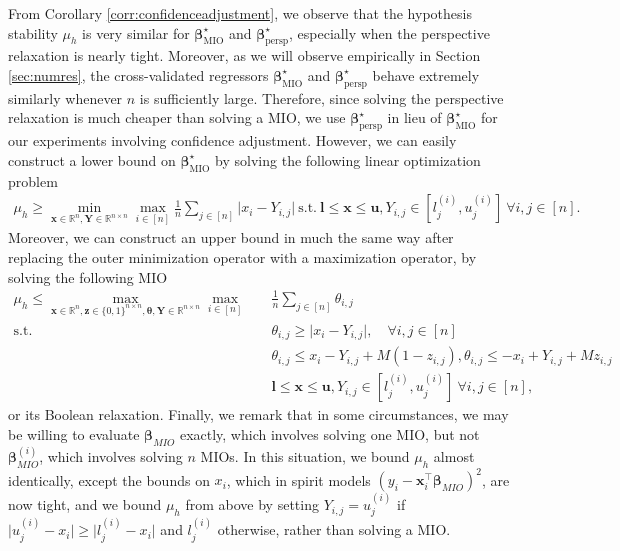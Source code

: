 \documentclass[opre,nonblindrev]{informs3} %
\begin{document}
From Corollary \ref{corr:confidenceadjustment}, we observe that the hypothesis stability $\mu_h$ is very similar for $\bm{\beta}^\star_{\text{MIO}}$ and $\bm{\beta}^\star_{\text{persp}}$, especially when the perspective relaxation is nearly tight. Moreover, as we will observe empirically in Section \ref{sec:numres}, the cross-validated regressors $\bm{\beta}^\star_{\text{MIO}}$ and $\bm{\beta}^\star_{\text{persp}}$ behave extremely similarly whenever $n$ is sufficiently large. Therefore, since solving the perspective relaxation is much cheaper than solving a MIO, we use $\bm{\beta}^\star_{\text{persp}}$ in lieu of $\bm{\beta}^\star_{\text{MIO}}$ for our experiments involving confidence adjustment. However, we can easily construct a lower bound on $\bm{\beta}^\star_{\text{MIO}}$ by solving the following linear optimization problem
\begin{align*}
    \mu_h \geq \min_{\bm{x} \in \mathbb{R}^n, \bm{Y} \in \mathbb{R}^{n \times n}}\max_{i \in [n]} \frac{1}{n} \sum_{j \in [n]}\vert x_i-Y_{i,j}\vert \ \text{s.t.} \ \bm{l} \leq \bm{x} \leq \bm{u}, Y_{i,j} \in [l_j^{(i)}, u_j^{(i)}] \ \forall i,j \in [n].
\end{align*}
Moreover, we can construct an upper bound in much the same way after replacing the outer minimization operator with a maximization operator, by solving the following MIO
\begin{align*}
    \mu_h \leq \max_{\bm{x} \in \mathbb{R}^n, \bm{z} \in \{0, 1\}^{n\times n}, \bm{\theta}, \bm{Y} \in \mathbb{R}^{n \times n}}\max_{i \in [n]} \quad & \frac{1}{n} \sum_{j \in [n]}\theta_{i,j} \\
    \text{s.t.} \quad & \theta_{i,j} \geq \vert x_i-Y_{i,j}\vert, \quad \forall i,j \in [n]\\
    & \theta_{i,j} \leq x_i-Y_{i,j}+M (1-z_{i,j}), \theta_{i,j} \leq -x_i+Y_{i,j}+M z_{i,j}\\
    & \bm{l} \leq \bm{x} \leq \bm{u}, Y_{i,j} \in [l_j^{(i)}, u_j^{(i)}] \ \forall i,j \in [n],
\end{align*}
or its Boolean relaxation. Finally, we remark that in some circumstances, we may be willing to evaluate $\bm{\beta}_{MIO}$ exactly, which involves solving one MIO, but not $\bm{\beta}^{(i)}_{MIO}$, which involves solving $n$ MIOs. In this situation, we bound $\mu_h$ almost identically, except the bounds on $x_i$, which in spirit models $(y_i-\bm{x}_i^\top \bm{\beta}_{MIO})^2$, are now tight, and we bound $\mu_h$ from above by setting $Y_{i,j}=u_j^{(i)}$ if $\vert u_j^{(i)}-x_i\vert \geq \vert l_j^{(i)}-x_i\vert$ and $l_j^{(i)}$ otherwise, rather than solving a MIO.
\end{document}
